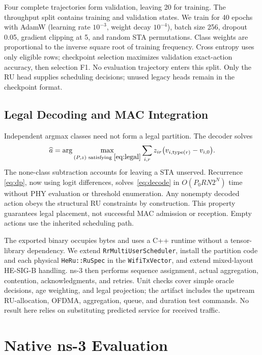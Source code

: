 \documentclass[10pt,journal,onecolumn]{IEEEtran}
\begin{document}
Four complete trajectories form validation, leaving 20 for training.
The throughput split contains \TTrainRows{} training and \TValidationRows{}
validation states. We train for 40 epochs with AdamW (learning rate
$10^{-3}$, weight decay $10^{-4}$), batch size 256, dropout 0.05, gradient
clipping at 5, and random STA permutations. Class weights are proportional
to the inverse square root of training frequency. Cross entropy uses only
eligible rows; checkpoint selection maximizes validation exact-action
accuracy, then selection F1. No evaluation trajectory enters this split.
Only the RU head supplies scheduling decisions; unused legacy heads remain
in the checkpoint format.

\subsection{Legal Decoding and MAC Integration}
Independent argmax classes need not form a legal partition. The decoder solves
\begin{equation}
 \widehat a=\arg\max_{(P,z)\text{ satisfying }\eqref{eq:legal}}
   \sum_{i,r}z_{ir}\big(v_{i,\operatorname{type}(r)}-v_{i,0}\big).
 \label{eq:decode}
\end{equation}
The none-class subtraction accounts for leaving a STA unserved. Recurrence
\eqref{eq:dp}, now using logit differences, solves~\eqref{eq:decode} in
$O(P_0RN2^N)$ time without PHY evaluation or threshold enumeration. Any
nonempty decoded action obeys the structural RU constraints by construction.
This property guarantees legal placement, not successful MAC admission or
reception. Empty actions use the inherited scheduling path.

The exported binary occupies \ModelBytes{} bytes and uses a C++ runtime
without a tensor-library dependency. We extend
\texttt{RrMultiUserScheduler}, install the partition code and each physical
\texttt{HeRu::RuSpec} in the \texttt{WifiTxVector}, and extend mixed-layout
HE-SIG-B handling. ns-3 then performs sequence assignment, actual aggregation,
contention, acknowledgments, and retries. Unit checks cover simple oracle
decisions, age weighting, and legal projection; the artifact includes the
upstream RU-allocation, OFDMA, aggregation, queue, and duration test commands.
No result here relies on substituting predicted service for received traffic.

\section{Native ns-3 Evaluation}
\end{document}
